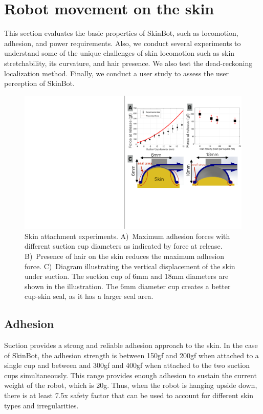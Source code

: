 \section{Robot movement on the skin}
This section evaluates the basic properties of SkinBot, such as locomotion, adhesion, and power requirements. Also, we conduct several experiments to understand some of the unique challenges of skin locomotion such as skin stretchability, its curvature, and hair presence. We also test the dead-reckoning localization method. Finally, we conduct a user study to assess the user perception of SkinBot.  

\begin{figure}[!t]
\centering
\includegraphics[width=12.0cm]{pictures/chapter3/skin_attachment_experiment.pdf}
\caption{Skin attachment experiments. A)~Maximum adhesion forces with different suction cup diameters as indicated by force at release. B)~Presence of hair on the skin reduces the maximum adhesion force. C)~Diagram illustrating the vertical displacement of the skin under suction. The suction cup of 6mm and 18mm diameters are shown in the illustration. The 6mm diameter cup creates a better cup-skin seal, as it has a larger seal area.}
\label{fig:skin_attachment_experiment}
\end{figure}

\subsection{Adhesion}
Suction provides a strong and reliable adhesion approach to the skin. In the case of SkinBot, the adhesion strength is between 150gf and 200gf when attached to a single cup and between and 300gf and 400gf when attached to the two suction cups simultaneously. This range provides enough adhesion to sustain the current weight of the robot, which is 20g. Thus, when the robot is hanging upside down, there is at least 7.5x safety factor that can be used to account for different skin types and irregularities. 

